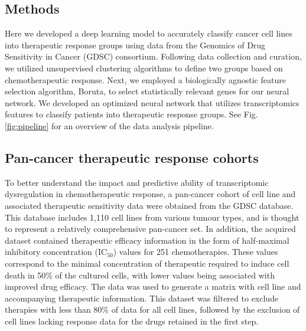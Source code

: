 \documentclass[10pt, letterpaper]{article}
\begin{document}
\begin{multicols*}{2}
\section{Methods}

Here we developed a deep learning model to accurately classify cancer cell lines into therapeutic response groups using data from the Genomics of Drug Sensitivity in Cancer (GDSC) consortium. Following data collection and curation, we utilized unsupervised clustering algorithms to define two groups based on chemotherapeutic response. Next, we employed a biologically agnostic feature selection algorithm, Boruta, to select statistically relevant genes for our neural network. We developed an optimized neural network that utilizes transcriptomics features to classify patients into therapeutic response groups. See Fig. \ref{fig:pipeline} for an overview of the data analysis pipeline.


\subsection*{Pan-cancer therapeutic response cohorts}
To better understand the impact and predictive ability of transcriptomic dysregulation in chemotherapeutic response, a pan-cancer cohort of cell line and associated therapeutic sensitivity data were obtained from the GDSC database. This database includes 1,110 cell lines from various tumour types, and is thought to represent a relatively comprehensive pan-cancer set. In addition, the acquired dataset contained therapeutic efficacy information in the form of half-maximal inhibitory concentration (IC$_{50}$) values for 251 chemotherapies. These values correspond to the minimal concentration of therapeutic required to induce cell death in 50\% of the cultured cells, with lower values being associated with improved drug efficacy. The data was used to generate a matrix with cell line and accompanying therapeutic information. This dataset was filtered to exclude therapies with less than 80\% of data for all cell lines, followed by the exclusion of cell lines lacking response data for the drugs retained in the first step.



\end{multicols*}
\end{document}
